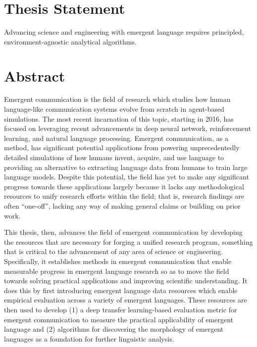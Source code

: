 \null\vfill

\section*{Thesis Statement}
Advancing science and engineering with emergent language requires principled, environment-agnostic analytical algorithms.

\section*{Abstract}
Emergent communication is the field of research which studies how human language-like communication systems evolve from scratch in agent-based simulations.
The most recent incarnation of this topic, starting in 2016, has focused on leveraging recent advancements in deep neural network, reinforcement learning, and natural language processing.
Emergent communication, as a method, has significant potential applications from powering unprecedentedly detailed simulations of how humans invent, acquire, and use language
  to providing an alternative to extracting language data from humans to train large language models.
Despite this potential, the field has yet to make any significant progress towards these applications largely because it lacks any methodological resources to unify research efforts within the field;
  that is, research findings are often ``one-off'', lacking any way of making general claims or building on prior work.

This thesis, then, advances the field of emergent communication by developing the resources that are necessary for forging a unified research program, something that is critical to the advancement of any area of science or engineering.
Specifically, it establishes methods in emergent communication that enable measurable progress in emergent language research so as to move the field towards solving practical applications and improving scientific understanding.
It does this by first introducing emergent language data resources which enable empirical evaluation across a variety of emergent languages.
These resources are then used to develop
  (1) a deep transfer learning-based evaluation metric for emergent communication to measure the practical applicability of emergent language
  and (2) algorithms for discovering the morphology of emergent languages as a foundation for further linguistic analysis.

\vfill
